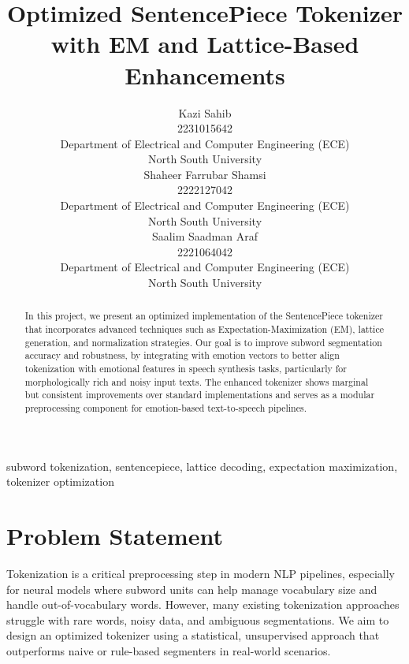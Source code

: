 \documentclass[twoside,11pt]{article}
\begin{document}
\title{Optimized SentencePiece Tokenizer with EM and Lattice-Based Enhancements}

\author{\name Kazi Sahib \\ 2231015642 \\ \addr Department of Electrical and Computer Engineering (ECE) \\ North South University \\ \AND \name Shaheer Farrubar Shamsi \\2222127042 \\ \addr Department of Electrical and Computer Engineering (ECE) \\ North South University  \\ \AND \name Saalim Saadman Araf \\ 2221064042 \\ \addr Department of Electrical and Computer Engineering (ECE) \\ North South University}


\maketitle


\begin{abstract}
In this project, we present an optimized implementation of the SentencePiece tokenizer that incorporates advanced techniques such as Expectation-Maximization (EM), lattice generation, and normalization strategies. Our goal is to improve subword segmentation accuracy and robustness, by integrating with emotion vectors to better align tokenization with emotional features in speech synthesis tasks, particularly for morphologically rich and noisy input texts. The enhanced tokenizer shows marginal but consistent improvements over standard implementations and serves as a modular preprocessing component for emotion-based text-to-speech pipelines.
\end{abstract}



\begin{keywords}
subword tokenization, sentencepiece, lattice decoding, expectation maximization, tokenizer optimization
\end{keywords}

\section{Problem Statement}
Tokenization is a critical preprocessing step in modern NLP pipelines, especially for neural models where subword units can help manage vocabulary size and handle out-of-vocabulary words. However, many existing tokenization approaches struggle with rare words, noisy data, and ambiguous segmentations. We aim to design an optimized tokenizer using a statistical, unsupervised approach that outperforms naive or rule-based segmenters in real-world scenarios.
\end{document}

